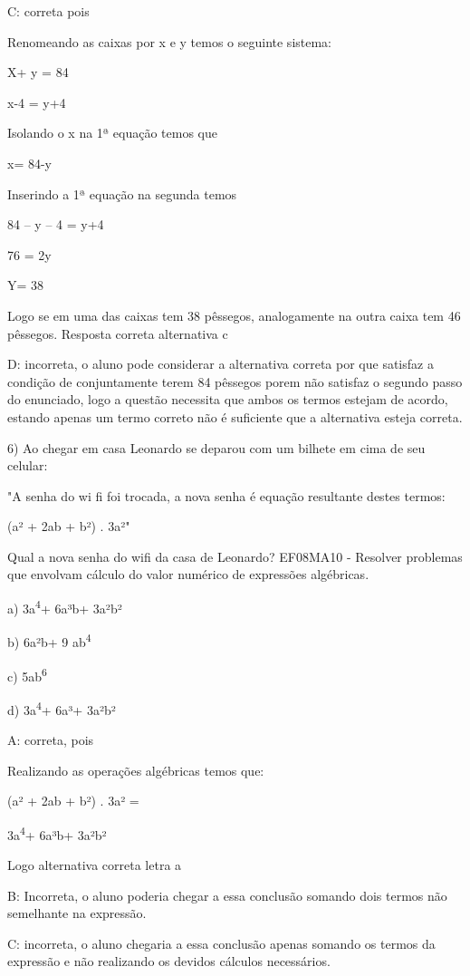 C: correta pois

Renomeando as caixas por x e y temos o seguinte sistema:

X+ y = 84

x-4 = y+4

Isolando o x na 1ª equação temos que

x= 84-y

Inserindo a 1ª equação na segunda temos

84 -- y -- 4 = y+4

76 = 2y

Y= 38

Logo se em uma das caixas tem 38 pêssegos, analogamente na outra caixa
tem 46 pêssegos. Resposta correta alternativa c

D: incorreta, o aluno pode considerar a alternativa correta por que
satisfaz a condição de conjuntamente terem 84 pêssegos porem não
satisfaz o segundo passo do enunciado, logo a questão necessita que
ambos os termos estejam de acordo, estando apenas um termo correto não é
suficiente que a alternativa esteja correta.

6) Ao chegar em casa Leonardo se deparou com um bilhete em cima de seu
celular:

"A senha do wi fi foi trocada, a nova senha é equação resultante destes
termos:

(a² + 2ab + b²) . 3a²"

Qual a nova senha do wifi da casa de Leonardo? EF08MA10 - Resolver
problemas que envolvam cálculo do valor numérico de expressões
algébricas.

a) 3a\textsuperscript{4}+ 6a³b+ 3a²b²

b) 6a²b+ 9 ab\textsuperscript{4}

c) 5ab\textsuperscript{6}

d) 3a\textsuperscript{4}+ 6a³+ 3a²b²

A: correta, pois

Realizando as operações algébricas temos que:

(a² + 2ab + b²) . 3a² =

3a\textsuperscript{4}+ 6a³b+ 3a²b²

Logo alternativa correta letra a

B: Incorreta, o aluno poderia chegar a essa conclusão somando dois
termos não semelhante na expressão.

C: incorreta, o aluno chegaria a essa conclusão apenas somando os termos
da expressão e não realizando os devidos cálculos necessários.


